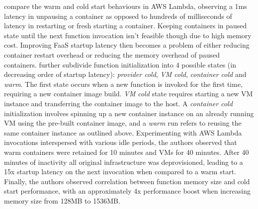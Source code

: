 \textcite{hendrickson16openlambda} compare the warm and cold start behaviours in AWS Lambda, observing a 1ms latency in unpausing a container as opposed to hundreds of milliseconds of latency in restarting or fresh starting a container. Keeping containers in paused state until the next function invocation isn't feasible though due to high memory cost. Improving FaaS startup latency then becomes a problem of either reducing container restart overhead or reducing the memory overhead of paused containers. \textcite{lloydserverless} further subdivide function initialization into 4 possible states (in decreasing order of startup latency): \textit{provider cold}, \textit{VM cold}, \textit{container cold} and \textit{warm}. The first state occurs when a new function is invoked for the first time, requiring a new container image build. \textit{VM cold} state requires starting a new VM instance and transferring the container image to the host. A \textit{container cold} initialization involves spinning up a new container instance on an already running VM using the pre-built container image, and a \textit{warm} run refers to reusing the same container instance as outlined above. Experimenting with AWS Lambda invocations interspersed with various idle periods, the authors observed that warm containers were retained for 10 minutes and VMs for 40 minutes. After 40 minutes of inactivity all original infrastructure was deprovisioned, leading to a 15x startup latency on the next invocation when compared to a warm start. Finally, the authors observed correlation between function memory size and cold start performance, with an approximately 4x performance boost when increasing memory size from 128MB to 1536MB.

